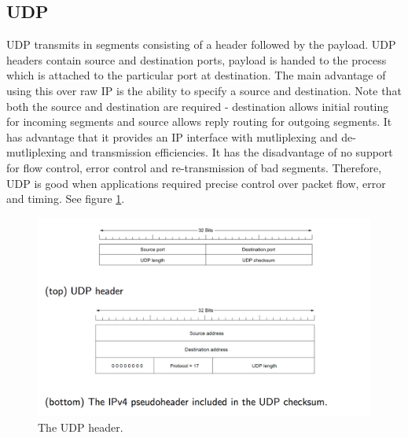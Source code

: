\documentclass[twoside]{article}
\begin{document}
\subsection{UDP}
UDP transmits in segments consisting of a header followed by the payload. UDP
headers contain source and destination ports, payload is handed to the process
which is attached to the particular port at destination. The main advantage of
using this over raw IP is the ability to specify a source and destination. 
Note that both the source and destination are required - destination allows 
initial routing for incoming segments and source allows reply routing for
outgoing segments. It has advantage that it provides an IP interface with 
mutliplexing and de-mutliplexing and transmission efficiencies. It has the 
disadvantage of no support for flow control, error control and re-transmission of 
bad segments. Therefore, UDP is good when applications required precise 
control over packet flow, error and timing. See figure \ref{fig:udp-header}.
\begin{figure}
  \includegraphics[width=\linewidth]{udp-header.png}
  \caption{The UDP header.}
  \label{fig:udp-header}
\end{figure}
\end{document}
